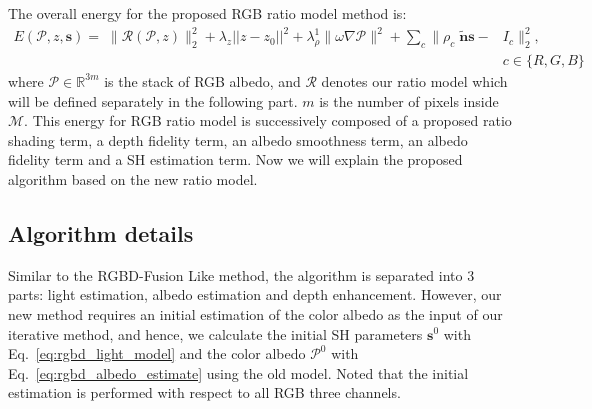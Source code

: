 The overall energy for the proposed RGB ratio model method is:
\begin{equation}\label{eq:ratio_energy}
    \begin{split}
    E(\mathcal{P}, z, \mathbf{s}) = \; \lVert \mathscr{R}(\mathcal{P}, z) \rVert^2_2 
    + \lambda_z||z - z_0||^2
    + \lambda_{\rho}^1 \lVert \omega \nabla \mathcal{P} \rVert^2
    + \sum_{c} \lVert \rho_c \;  \tilde{\mathbf{n}}\mathbf{s} - &I_c \rVert^2_2, \; \\ &c\in\{R,G,B\}
    \end{split}
\end{equation}
where $\mathcal{P}\in\mathbb{R}^{3m}$ is the stack of RGB albedo, and $\mathscr{R}$ denotes our ratio model which will be defined separately in the following part. $m$ is the number of pixels inside $\mathcal{M}$.
This energy for RGB ratio model is successively composed of a proposed ratio shading term, a depth fidelity term, an albedo smoothness term, an albedo fidelity term and a SH estimation term.
Now we will explain the proposed algorithm based on the new ratio model.


\subsection{Algorithm details}
Similar to the RGBD-Fusion Like method, the algorithm is separated into 3 parts: light estimation, albedo estimation and depth enhancement.
However, our new method requires an initial estimation of the color albedo as the input of our iterative method, and hence, we calculate the initial SH parameters $\mathbf{s}^{0}$ with Eq.~\ref{eq:rgbd_light_model} and the color albedo $\mathcal{P}^{0}$ with Eq.~\ref{eq:rgbd_albedo_estimate} using the old model.
Noted that the initial estimation is performed with respect to all RGB three channels.

